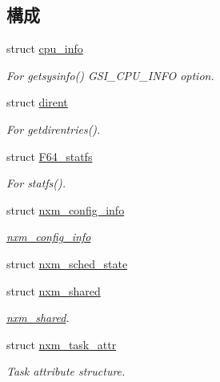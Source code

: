 \subsection*{構成}
\begin{DoxyCompactItemize}
\item 
struct \hyperlink{structTru64_1_1cpu__info}{cpu\_\-info}
\begin{DoxyCompactList}\small\item\em For getsysinfo() GSI\_\-CPU\_\-INFO option. \item\end{DoxyCompactList}\item 
struct \hyperlink{structTru64_1_1dirent}{dirent}
\begin{DoxyCompactList}\small\item\em For getdirentries(). \item\end{DoxyCompactList}\item 
struct \hyperlink{structTru64_1_1F64__statfs}{F64\_\-statfs}
\begin{DoxyCompactList}\small\item\em For statfs(). \item\end{DoxyCompactList}\item 
struct \hyperlink{structTru64_1_1nxm__config__info}{nxm\_\-config\_\-info}
\begin{DoxyCompactList}\small\item\em \hyperlink{structTru64_1_1nxm__config__info}{nxm\_\-config\_\-info} \item\end{DoxyCompactList}\item 
struct \hyperlink{structTru64_1_1nxm__sched__state}{nxm\_\-sched\_\-state}
\item 
struct \hyperlink{structTru64_1_1nxm__shared}{nxm\_\-shared}
\begin{DoxyCompactList}\small\item\em \hyperlink{structTru64_1_1nxm__shared}{nxm\_\-shared}. \item\end{DoxyCompactList}\item 
struct \hyperlink{structTru64_1_1nxm__task__attr}{nxm\_\-task\_\-attr}
\begin{DoxyCompactList}\small\item\em Task attribute structure. \item\end{DoxyCompactList}\item 

\end{DoxyCompactItemize}
